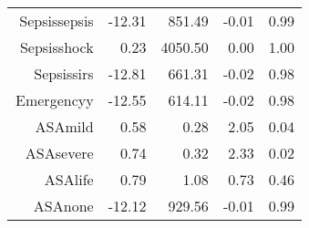 \begin{tabular}{rrrrr}
$$  Sepsis\-sepsis & -12.31 & 851.49 & -0.01 & 0.99 \\ 
  Sepsis\-shock & 0.23 & 4050.50 & 0.00 & 1.00 \\ 
  Sepsis\-sirs & -12.81 & 661.31 & -0.02 & 0.98 \\ 
  Emergency\-y & -12.55 & 614.11 & -0.02 & 0.98 \\ 
  ASA\-mild & 0.58 & 0.28 & 2.05 & 0.04 \\ 
  ASA\-severe & 0.74 & 0.32 & 2.33 & 0.02 \\ 
  ASA\-life & 0.79 & 1.08 & 0.73 & 0.46 \\ 
  ASA\-none & -12.12 & 929.56 & -0.01 & 0.99 \\ 
   \hline
\end{tabular}

